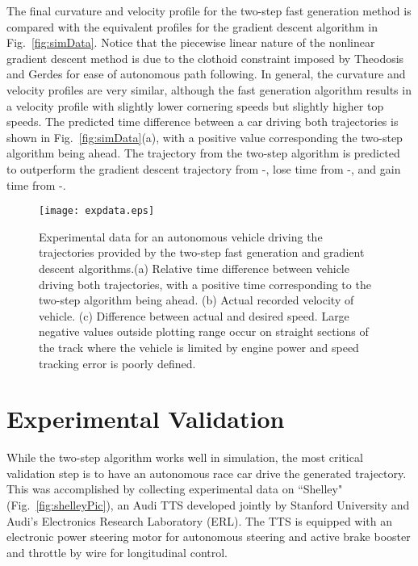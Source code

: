 \documentclass[twocolumn,10pt]{asme2ej}
\newcommand*\circled[1]{\tikz[baseline=(char.base)]{
            \node[shape=circle,draw,inner sep=2pt] (char) {#1};}}
\begin{document}
The final curvature and velocity profile  for the two-step fast generation method is compared with the equivalent profiles for the gradient
descent algorithm in Fig.~\ref{fig:simData}. Notice that the piecewise linear nature of the 
nonlinear gradient descent method is due to the clothoid constraint imposed by Theodosis and Gerdes \cite{theodosis} for ease of autonomous path following.
In general, the curvature and velocity profiles are very similar, although the fast generation algorithm results in a velocity profile
with slightly lower cornering speeds but slightly higher top speeds. The predicted time difference between a car driving both trajectories 
is shown in Fig.~\ref{fig:simData}(a), with a positive
value corresponding the two-step algorithm being ahead. The trajectory from the two-step algorithm is predicted to outperform the 
gradient descent trajectory from \circled{a}-\circled{c}, lose time from \circled{c}-\circled{e}, and gain time from \circled{e}-\circled{h}.

\begin{figure*}
\centering
\texttt{[image: expdata.eps]}
\caption{Experimental data for an autonomous vehicle driving the trajectories provided by the two-step fast generation and gradient descent algorithms.(a) Relative time difference
between vehicle driving both trajectories, with a positive time corresponding to the two-step algorithm being ahead. (b) Actual
recorded velocity of vehicle. (c) Difference between actual and desired speed. Large negative values outside plotting range occur 
 on straight sections of the track where the vehicle is limited by engine power and speed tracking error is poorly defined.}
\label{fig:expdata}
\end{figure*}

\section{Experimental Validation} 
\label{sec:EXP}
While the two-step algorithm works well in simulation, the most critical validation step is to have an
autonomous race car drive the generated trajectory. This was accomplished by collecting experimental data on ``Shelley" (Fig.~\ref{fig:shelleyPic}), an
Audi TTS developed jointly by Stanford University and Audi's Electronics Research Laboratory (ERL). The TTS is equipped 
with an electronic power steering motor for autonomous steering and active brake booster and throttle by wire for
longitudinal control. 
\end{document}
